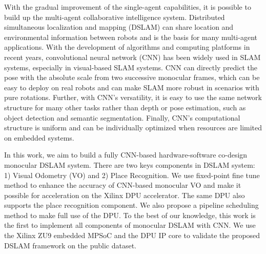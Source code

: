 With the gradual improvement of the single-agent capabilities, it is possible to build up the multi-agent collaborative intelligence system.
Distributed simultaneous localization and mapping (DSLAM) can share location and environmental information between robots and is the basis for many multi-agent applications.
With the development of algorithms and computing platforms in recent years, convolutional neural network (CNN) has been widely used in SLAM systems, especially in visual-based SLAM systems.
CNN can directly predict the pose with the absolute scale from two successive monocular frames, which can be easy to deploy on real robots and can make SLAM more robust in scenarios with pure rotations. Further, with CNN's versatility, it is easy to use the same network structure for many other tasks rather than depth or pose estimation, such as object detection and semantic segmentation.
Finally, CNN's computational structure is uniform and can be individually optimized when resources are limited on embedded systems.

In this work, we aim to build a fully CNN-based hardware-software co-design monocular DSLAM system. There are two keys components in DSLAM system: 1) Visual Odometry (VO) and 2) Place Recognition. We use fixed-point fine tune method to enhance the accuracy of CNN-based monocular VO and make it possible for acceleration on the Xilinx DPU accelerator. The same DPU also supports the place recognition component. We also propose a pipeline scheduling method to make full use of the DPU. To the best of our knowledge, this work is the first to implement all components of monocular DSLAM with CNN. We use the Xilinx ZU9 embedded MPSoC and the DPU IP core to validate the proposed DSLAM framework on the public dataset.